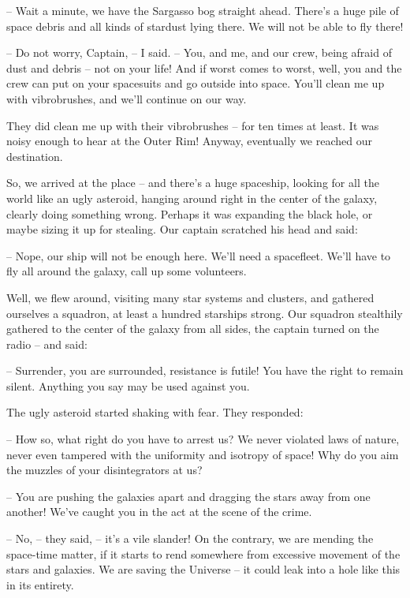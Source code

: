 \documentclass[ebook,oneside,final,openright]{memoir}
\begin{document}
– Wait a minute, we have the Sargasso bog straight ahead. There’s a huge pile of space debris and all kinds of stardust lying there. We will not be able to fly there!\par
– Do not worry, Captain, – I said. – You, and me, and our crew, being afraid of dust and debris – not on your life! And if worst comes to worst, well, you and the crew can put on your spacesuits and go outside into space. You’ll clean me up with vibrobrushes, and we’ll continue on our way.\par
\par
They did clean me up with their vibrobrushes – for ten times at least. It was noisy enough to hear at the Outer Rim! Anyway, eventually we reached our destination.\par
\par
So, we arrived at the place – and there’s a huge spaceship, looking for all the world like an ugly asteroid, hanging around right in the center of the galaxy, clearly doing something wrong. Perhaps it was expanding the black hole, or maybe sizing it up for stealing. Our captain scratched his head and said:\par
– Nope, our ship will not be enough here. We’ll need a spacefleet. We’ll have to fly all around the galaxy, call up some volunteers.\par
Well, we flew around, visiting many star systems and clusters, and gathered ourselves a squadron, at least a hundred starships strong. Our squadron stealthily gathered to the center of the galaxy from all sides, the captain turned on the radio – and said:\par
– Surrender, you are surrounded, resistance is futile! You have the right to remain silent. Anything you say may be used against you.\par
The ugly asteroid started shaking with fear. They responded:\par
– How so, what right do you have to arrest us? We never violated laws of nature, never even tampered with the uniformity and isotropy of space! Why do you aim the muzzles of your disintegrators at us?\par
– You are pushing the galaxies apart and dragging the stars away from one another! We’ve caught you in the act at the scene of the crime.\par
– No, – they said, – it’s a vile slander! On the contrary, we are mending the space-time matter, if it starts to rend somewhere from excessive movement of the stars and galaxies. We are saving the Universe – it could leak into a hole like this in its entirety.\par
\end{document}
